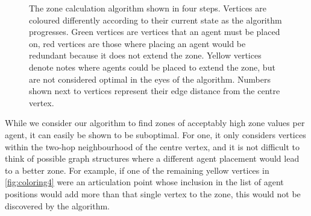 \begin{figure}
  \caption{The zone calculation algorithm shown in four steps.
           Vertices are coloured differently according to their current state as the algorithm progresses.
           Green vertices are vertices that an agent must be placed on, red vertices are those where placing an agent would be redundant because it does not extend the zone.
           Yellow vertices denote notes where agents could be placed to extend the zone, but are not considered optimal in the eyes of the algorithm.
           Numbers shown next to vertices represent their edge distance from the centre vertex.}
  \label{fig:zones}
\end{figure}
While we consider our algorithm to find zones of acceptably high zone values per agent, it can easily be shown to be suboptimal.
For one, it only considers vertices within the two-hop neighbourhood of the centre vertex, and it is not difficult to think of possible graph structures where a different agent placement would lead to a better zone.
For example, if one of the remaining yellow vertices in \autoref{fig:coloring4} were an articulation point whose inclusion in the list of agent positions would add more than that single vertex to the zone, this would not be discovered by the algorithm.
